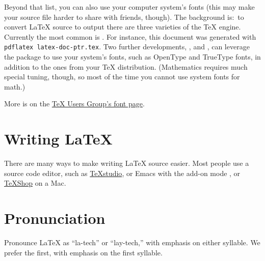 \documentclass[11pt]{article}
\begin{document}
\begin{multicols*}{2}
Beyond that list, you can also use your computer system's fonts
(this may make your source file harder to share with friends, though).
The background is:~to convert \LaTeX{} source to \PDF{} output
there are three varieties of the \TeX{} engine.
Currently the most common is 
\href{https://tug.org/applications/pdftex/}{\package{\pdfTeX}}.
For instance, this document was generated with 
\verb!pdflatex latex-doc-ptr.tex!.
Two further developments, 
\href{https://tug.org/xetex/}{\package{\XeTeX}},
and 
\href{http://www.luatex.org/}{\package{\LuaTeX}},
can leverage
the 
package to use your system's fonts,
such as OpenType and TrueType fonts,
in addition to the ones from your \TeX{} distribution.
(Mathematics requires much special tuning, though, so most
of the time you cannot use system fonts for math.)

More is on the 
\href{https://tug.org/fonts/}{\TeX{} Users Group's font page}.





\section{Writing \LaTeX{}}

There are many ways to make writing \LaTeX{} source easier.
Most people use a source code editor, such as 
\href{https://www.texstudio.org/}{\TeX{}studio}, or 
Emacs with the add-on mode 
\href{https://www.gnu.org/software/auctex/}{}, 
or \href{https://pages.uoregon.edu/koch/texshop/}{\TeX{}Shop} on
a Mac.


\section{Pronunciation}
Pronounce \LaTeX{} as
``la-tech'' or ``lay-tech,'' with emphasis on either syllable.
We prefer the first, with emphasis on the first syllable.




\end{multicols*}
\end{document}
